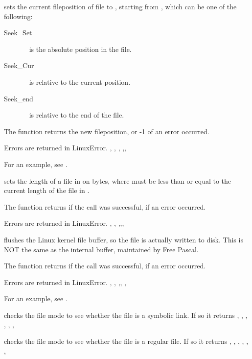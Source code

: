 { sets the current fileposition of file  to
, starting from , which can be one of the following:
\begin{description}
\item [Seek\_Set] \  is the absolute position in the file.
\item [Seek\_Cur] \  is relative to the current position.
\item [Seek\_end] \  is relative to the end of the file.
\end{description}

The function returns the new fileposition, or -1 of an error occurred.
}
{Errors are returned in LinuxError.}
{, , ,
,,
 }

For an example, see .

{ sets the length of a file in  on 
bytes, where  must be less than or equal to the current length of
the file in .

The function returns  if the call was successful,  if
an error occurred.}
{Errors are returned in LinuxError.}
{, , ,,,
}

{ flushes the Linux kernel file buffer, so the file is actually
written to disk. This is NOT the same as the internal buffer, maintained by
Free Pascal. 

The function returns  if the call was successful,  if
an error occurred.}
{Errors are returned in LinuxError.}
{, , ,,
, }

For an example, see .

{  checks the file mode  to see whether the file is a
symbolic link. If so it returns 
}
{,
 ,
 ,
 ,
 ,
 ,
}



{  checks the file mode  to see whether the file is a
regular file. If so it returns 
}
{,
 , 
 ,
 ,
 ,
 ,
}


